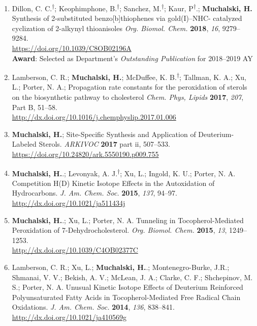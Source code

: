 \documentclass[11pt,letterpaper]{article}
\begin{document}
\begin{enumerate}[itemindent=0pt]
	\item Dillon, C. C.\textsuperscript{$\dagger$}; Keophimphone, B.\textsuperscript{$\dagger$}; Sanchez, M.\textsuperscript{$\dagger$}; Kaur, P\textsuperscript{$\dagger$}.; \textbf{Muchalski, H.} Synthesis of 2-substituted benzo[b]thiophenes via gold(I)--NHC- catalyzed cyclization of 2-alkynyl thioanisoles \textit{Org. Biomol. Chem.} \textbf{2018}, \textit{16}, 9279--9284.\\
	\href{https://doi.org/10.1039/C8OB02196A}{https://doi.org/10.1039/C8OB02196A}\\
	\textbf{Award}: Selected as Department's \textit{Outstanding Publication} for 2018--2019 AY
 
  \item Lamberson, C. R.; \textbf{Muchalski, H.}; McDuffee, K. B.\textsuperscript{$\dagger$}; Tallman, K. A.; Xu, L.; Porter, N. A.; Propagation rate constants for the peroxidation of sterols on the biosynthetic pathway to cholesterol \textit{Chem. Phys, Lipids} \textbf{2017}, \textit{207}, Part B, 51--58. \\
  \href{http://dx.doi.org/10.1016/j.chemphyslip.2017.01.006}{http://dx.doi.org/10.1016/j.chemphyslip.2017.01.006} 

  \item \textbf{Muchalski, H.}; Site-Specific Synthesis and Application of Deuterium-Labeled Sterols. \textit{ARKIVOC} \textbf{2017} part ii, 507--533.\\
  \href{https://doi.org/10.24820/ark.5550190.p009.755}{https://doi.org/10.24820/ark.5550190.p009.755}

  \item \textbf{Muchalski, H.}.; Levonyak, A. J.\textsuperscript{$\dagger$}; Xu, L.; Ingold, K. U.; Porter, N. A. Competition H(D) Kinetic Isotope Effects in the Autoxidation of Hydrocarbons. \textit{J. Am. Chem. Soc.} \textbf{2015}, \textit{137}, 94--97. \\
  \href{http://dx.doi.org/10.1021/ja511434j}{http://dx.doi.org/10.1021/ja511434j} 

  \item \textbf{Muchalski, H.}.; Xu, L.; Porter, N. A. Tunneling in Tocopherol-Mediated Peroxidation of 7-Dehydrocholesterol. \textit {Org. Biomol. Chem.} \textbf{2015}, \textit{13}, 1249--1253. \\
  \href{http://dx.doi.org/10.1039/C4OB02377C}{http://dx.doi.org/10.1039/C4OB02377C}
 
  \item Lamberson, C. R.; Xu, L.; \textbf{Muchalski, H.}.; Montenegro-Burke, J.R.; Shmanai, V. V.; Bekish, A. V.; McLean, J. A.; Clarke, C. F.; Shchepinov, M. S.; Porter, N. A. Unusual Kinetic Isotope Effects of Deuterium Reinforced Polyunsaturated Fatty Acids in Tocopherol-Mediated Free Radical Chain Oxidations. \textit{J. Am. Chem. Soc.} \textbf{2014}, \textit{136}, 838--841. \\
  \href{http://dx.doi.org/10.1021/ja410569g}{http://dx.doi.org/10.1021/ja410569g}
    

\end{enumerate}
\end{document}

